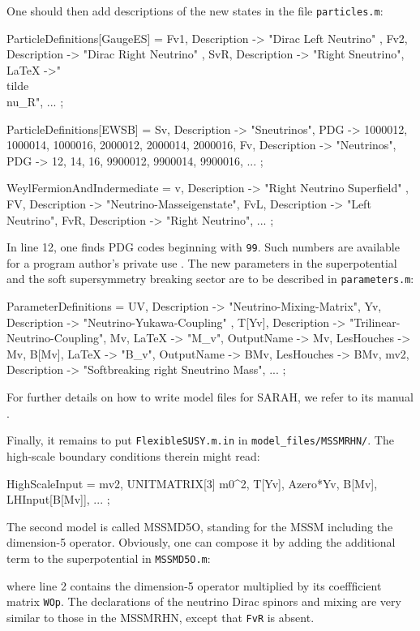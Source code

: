\documentclass[final,3p,11pt,pdflatex]{elsarticle}
\makeatletter
\newcommand{\sarah}{SARAH\@\xspace}
\newcommand{\code}[1]{\lstinline|#1|}  %
\makeatother
\begin{document}
One should then add descriptions of the new states in the file
\code{particles.m}:
\begin{numlstlisting}
ParticleDefinitions[GaugeES] = {
  {Fv1, { Description -> "Dirac Left Neutrino" }},
  {Fv2, { Description -> "Dirac Right Neutrino" }},
  {SvR, { Description -> "Right Sneutrino", LaTeX ->"\\tilde{\\nu}_R"}},
  ...
};

ParticleDefinitions[EWSB] = {
  {Sv, { Description -> "Sneutrinos",
         PDG -> {1000012, 1000014, 1000016, 2000012, 2000014, 2000016}}},
  {Fv, { Description -> "Neutrinos",
         PDG -> {12, 14, 16, 9900012, 9900014, 9900016}}},
  ...
};

WeylFermionAndIndermediate = {
  {v,   { Description -> "Right Neutrino Superfield" }},
  {FV,  { Description -> "Neutrino-Masseigenstate"}},
  {FvL, { Description -> "Left Neutrino"}},
  {FvR, { Description -> "Right Neutrino"}},
  ...
};
\end{numlstlisting}
In line 12, one finds PDG codes beginning with \code{99}.
Such numbers are available for a program author's private use
\cite{Beringer:1900zz}.
The new parameters in the superpotential
and the soft supersymmetry breaking sector
are to be described in \code{parameters.m}:
\begin{numlstlisting}
ParameterDefinitions = {
  {UV,    { Description -> "Neutrino-Mixing-Matrix"}},
  {Yv,    { Description -> "Neutrino-Yukawa-Coupling" }},
  {T[Yv], { Description -> "Trilinear-Neutrino-Coupling"}},
  {Mv,    { LaTeX -> "M_v", OutputName -> Mv, LesHouches -> Mv}},
  {B[Mv], { LaTeX -> "B_v", OutputName -> BMv, LesHouches -> BMv}},
  {mv2,   { Description -> "Softbreaking right Sneutrino Mass"}},
  ...
};
\end{numlstlisting}
For further details on how to write model files for \sarah, we refer
to its manual \cite{Staub:2008uz,Staub:2013tta}.

Finally, it remains to put \code{FlexibleSUSY.m.in}
in \code{model_files/MSSMRHN/}.
The high-scale boundary conditions therein might read:
\begin{numlstlisting}
HighScaleInput = {
  {mv2, UNITMATRIX[3] m0^2},
  {T[Yv], Azero*Yv},
  {B[Mv], LHInput[B[Mv]]},
  ...
};
\end{numlstlisting}

The second model is called MSSMD5O, standing for
the MSSM including the dimension-5 operator.
Obviously, one can compose it by adding
the additional term to the superpotential in \code{MSSMD5O.m}:
\begin{numlstlisting}
SuperPotential = Yu u.q.Hu - Yd d.q.Hd - Ye e.l.Hd + \[Mu] Hu.Hd \
               + WOp/2 l.Hu.l.Hu;
\end{numlstlisting}
where line 2 contains the dimension-5 operator
multiplied by its coeffficient matrix \code{WOp}.
The declarations of the neutrino Dirac spinors and mixing are
very similar to those in the MSSMRHN,
except that \code{FvR} is absent.
\end{document}
